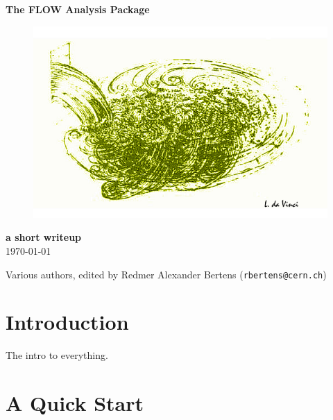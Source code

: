 \documentclass[a5paper]{book}
\numberwithin{equation}{subsection}
\renewcommand{\thefootnote}{\fnsymbol{footnote}}
\begin{document}
\noindent
\begin{center}
	\vspace*{1.5cm}
	{\LARGE \bf The FLOW Analysis Package}\\
		
	\vspace{1.5cm}
	\begin{figure}[hbt]
		\includegraphics[width=1.\textwidth]{figs/daVinci.png}
	\end{figure}
		
	\vspace{1.5cm}
	\noindent
	{\large \bf a short writeup}\\
	\today\\
\end{center}
\vfill
\noindent
Various authors, edited by Redmer Alexander Bertens (\texttt{rbertens@cern.ch})

\clearpage
\thispagestyle{empty}
\tableofcontents
\renewcommand{\thefootnote}{\alph{footnote}}
\mainmatter
\chapter{Introduction}
The intro to everything.
\chapter{A Quick Start}
\end{document}
